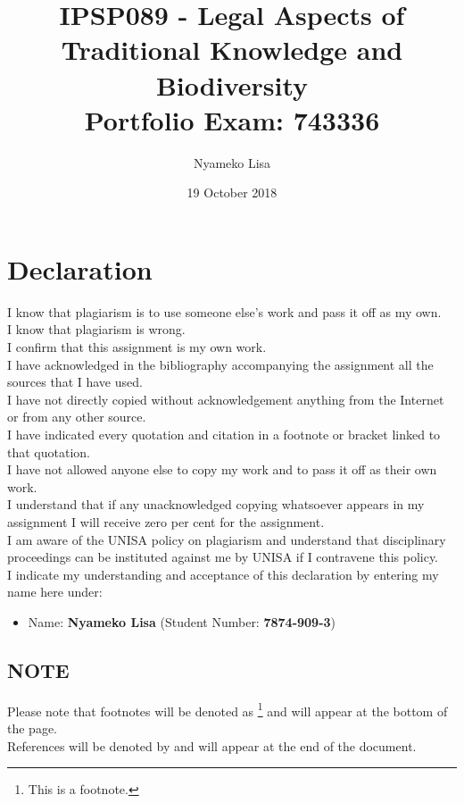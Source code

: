 \documentclass[11pt]{article}
\author{Nyameko Lisa}
\date{19 October 2018}
\title{IPSP089 - Legal Aspects of Traditional Knowledge and Biodiversity\\\medskip
\large Portfolio Exam: 743336}
\begin{document}
\maketitle
\addvspace{110pt}

\justifying
\addvspace{110pt}
\section*{Declaration}
\label{sec:org2a03ac6}
I know that plagiarism is to use someone else’s work and pass it off as my own.\\
I know that plagiarism is wrong.\\
I confirm that this assignment is my own work.\\
I have acknowledged in the bibliography accompanying the assignment all the sources that I have used.\\
I have not directly copied without acknowledgement anything from the Internet or from any other source.\\
I have indicated every quotation and citation in a footnote or bracket linked to that quotation.\\
I have not allowed anyone else to copy my work and to pass it off as their own work.\\
I understand that if any unacknowledged copying whatsoever appears in my assignment I will receive zero per cent for the assignment.\\
I am aware of the UNISA policy on plagiarism and understand that disciplinary proceedings can be instituted against me by UNISA if I contravene this policy.\\
I indicate my understanding and acceptance of this declaration by
entering my name here under:
\begin{itemize}
\item Name: \textbf{Nyameko Lisa} (Student Number: \textbf{7874-909-3})
\end{itemize}

\subsection*{NOTE}
\label{sec:org9d1fc7d}
Please note that footnotes will be denoted as \footnote{This is a footnote.} and will
appear at the bottom of the page.\\
References will be denoted by \cite{geyer10_towards_clearer_defin_underst_indi} and will appear at the end of the document.
\newpage
{}
\end{document}

